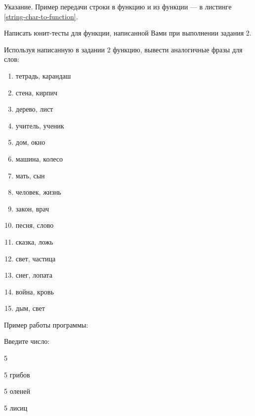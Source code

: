 Указание. Пример передачи строки в функцию и из функции --- в листинге \ref{string-char-to-function}.

\labtask

Написать юнит-тесты для функции, написанной Вами при выполнении задания 2.

\labtask

Используя написанную в задании 2 функцию, вывести аналогичные фразы для слов:

\begin{enumerate}

\item 	тетрадь, карандаш

\item 	стена, кирпич

\item 	дерево, лист

\item 	учитель, ученик

\item 	дом, окно

\item 	машина, колесо

\item 	мать, сын

\item 	человек, жизнь

\item 	закон, врач

\item 	песня, слово

\item 	сказка, ложь

\item 	свет, частица

\item 	снег, лопата

\item 	война, кровь

\item 	дым, свет


\end{enumerate}

Пример работы программы:

Введите число:

5

5 грибов

5 оленей

5 лисиц

\reservedtasks

